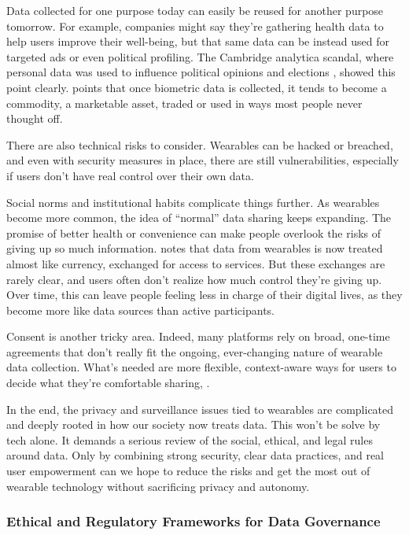 	Data collected for one purpose today can easily be reused for another purpose tomorrow. For example, companies might say they’re gathering health data to help users improve their well-being, but that same data can be instead used for targeted ads or even political profiling. The Cambridge analytica scandal, where personal data was used to influence political opinions and elections \cite{Kanakia2019}, showed this point clearly. \cite{deOliveira2022} points that once biometric data is collected, it tends to become a commodity, a marketable asset, traded or used in ways most people never thought off. 

	There are also technical risks to consider. Wearables can be hacked or breached, and even with security measures in place, there are still vulnerabilities, especially if users don’t have real control over their own data.

	Social norms and institutional habits complicate things further. As wearables become more common, the idea of “normal” data sharing keeps expanding. The promise of better health or convenience can make people overlook the risks of giving up so much information.\cite{VanDijck2014} notes that data from wearables is now treated almost like currency, exchanged for access to services. But these exchanges are rarely clear, and users often don’t realize how much control they’re giving up. Over time, this can leave people feeling less in charge of their digital lives, as they become more like data sources than active participants.

	Consent is another tricky area. Indeed, many platforms rely on broad, one-time agreements that don’t really fit the ongoing, ever-changing nature of wearable data collection. What’s needed are more flexible, context-aware ways for users to decide what they’re comfortable sharing, \cite{Riso2017}.

	In the end, the privacy and surveillance issues tied to wearables are complicated and deeply rooted in how our society now treats data. This won't be solve by tech alone. It demands a serious review of the social, ethical, and legal rules around data. Only by combining strong security, clear data practices, and real user empowerment can we hope to reduce the risks and get the most out of wearable technology without sacrificing privacy and autonomy.
	\subsubsection{Ethical and Regulatory Frameworks for Data Governance}

